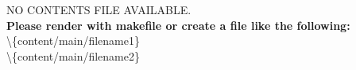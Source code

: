 \cleardoublepage
{} \label{listoftab}
\listoftables

\cleardoublepage
{} \label{listoflist}
\lstlistoflistings

\cleardoublepage
\printglossary[type=\acronymtype]
\cleardoublepage
\printglossary[style=altlist,title=Glossary]

\cleardoublepage \clearpage
{}
\patchcmd{\chapter}
{\clearpage}
{\cleardoublepage}
{}
{}
{}
{NO CONTENTS FILE AVAILABLE.\\
	\textbf{Please render with makefile or create a file like the following:}\\
	\textbackslash\{content/main/filename1\}\\
	\textbackslash\{content/main/filename2\}\\
}

\clearpage
{}

\cleardoublepage
{} \label{listoflit}
\printbibliography


\cleardoublepage
{
	\captionsetup{list=no}

	\begin{appendices}\label{appendices}
		\cleardoublepage
		\renewcommand{\thesubsection}{\Alph{subsection}}
		
	\end{appendices}
}
{}

